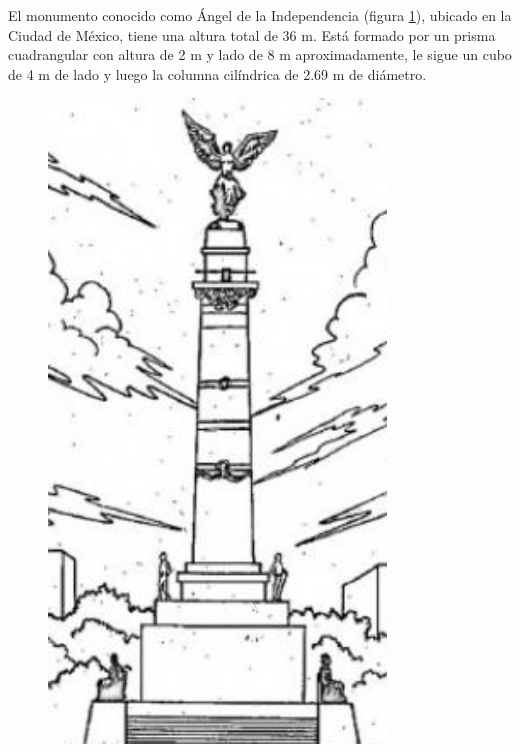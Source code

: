 El monumento conocido como Ángel de la Independencia (figura \ref{fig:angel_cil}), ubicado en
la Ciudad de México, tiene una altura total de 36 m. Está formado por un prisma
cuadrangular con altura de 2 m y lado de 8 m aproximadamente, le sigue un cubo de 4 m de lado y luego la columna cilíndrica de 2.69 m de diámetro.


\begin{minipage}{0.3\linewidth}
    \begin{figure}[H]
        \centering
        \includegraphics[width=0.8\textwidth]{../images/angel_cil.png}
        \caption{}
        \label{fig:angel_cil}
    \end{figure}
\end{minipage}
